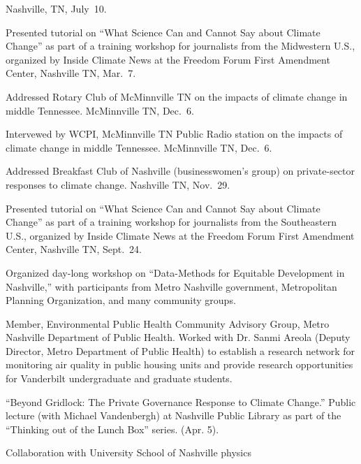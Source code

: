   Nashville, TN, July~10.
\item[2019] Presented tutorial on ``What Science Can and Cannot Say about
  Climate Change'' as part of a training workshop for journalists from the
  Midwestern U.S., organized by Inside Climate News at the Freedom Forum First
  Amendment Center, Nashville TN, Mar.~7.
\item[2018] Addressed Rotary Club of McMinnville TN on the impacts of climate
  change in middle Tennessee. McMinnville TN, Dec.\ 6.
\item[2018] Intervewed by WCPI, McMinnville TN Public Radio station on the
  impacts of climate change in middle Tennessee. McMinnville TN, Dec.\ 6.
\item[2018] Addressed Breakfast Club of Nashville (businesswomen's group) on
  private-sector responses to climate change. Nashville TN, Nov.\ 29.
\item[2018] Presented tutorial on ``What Science Can and Cannot Say about
  Climate Change'' as part of a training workshop for journalists from the
  Southeastern U.S., organized by Inside Climate News at the Freedom Forum
  First Amendment Center, Nashville TN, Sept.~24.
\item[2018] Organized day-long workshop on ``Data-Methods for Equitable
  Development in Nashville,'' with participants from Metro Nashville
  government, Metropolitan Planning Organization,
  and many community groups.
\item[2017--2019] Member, Environmental Public Health Community Advisory
  Group, Metro Nashville Department of Public Health. Worked with Dr. Sanmi
  Areola (Deputy Director, Metro Department of Public Health)
  to establish a research network for monitoring air quality in public housing
  units and provide research opportunities for Vanderbilt undergraduate and
  graduate students.
\item[2017] ``Beyond Gridlock: The Private Governance Response to Climate
  Change.'' Public lecture (with Michael Vandenbergh) at Nashville Public
  Library as part of the ``Thinking out of the Lunch Box'' series. (Apr. 5).
\item[2015--2017] Collaboration with University School of Nashville physics
